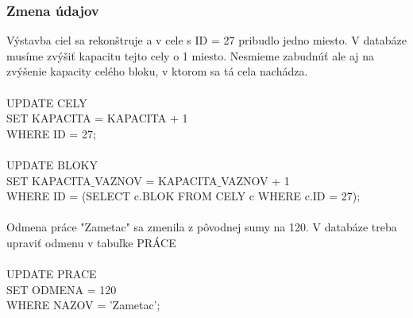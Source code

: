 \documentclass[slovak, 12pt, Times New Roman]{article}
\begin{document}
			\subsubsection{Zmena údajov}
				Výstavba ciel sa rekonštruje a v cele s ID = 27 pribudlo jedno miesto. V databáze musíme zvýšiť kapacitu tejto cely o 1 miesto. Nesmieme zabudnúť ale aj na zvýšenie kapacity celého bloku, v ktorom sa tá cela nachádza.\\
				\\
				UPDATE CELY\\
				SET KAPACITA = KAPACITA + 1\\
				WHERE ID = 27;\\
				\\
				UPDATE BLOKY\\
				SET KAPACITA$\_$VAZNOV = KAPACITA$\_$VAZNOV + 1\\
				WHERE ID = (SELECT c.BLOK FROM CELY c WHERE c.ID = 27);\\
				\\
				Odmena práce "Zametac" sa zmenila z pôvodnej sumy na 120. V databáze treba upraviť odmenu v tabuľke PRÁCE\\
				\\
				UPDATE PRACE\\
				SET ODMENA = 120\\
				WHERE NAZOV = 'Zametac';\\
\end{document}
